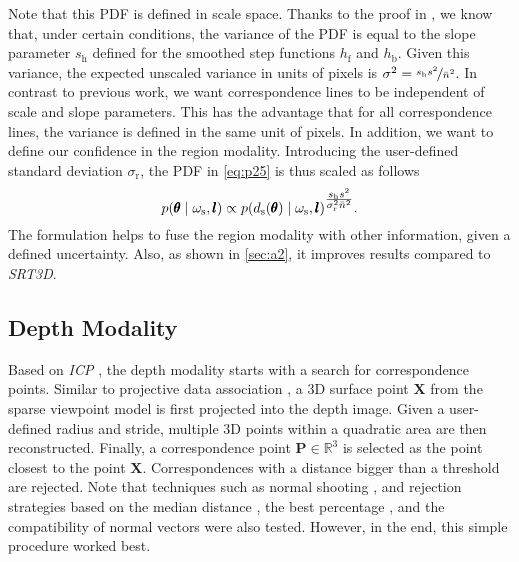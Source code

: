 \documentclass[10pt,twocolumn,letterpaper]{article}
\begin{document}
Note that this \ac{PDF} is defined in scale space.
Thanks to the proof in \cite{Stoiber2020b}, we know that, under certain conditions, the variance of the \ac{PDF} is equal to the slope parameter $s_\textrm{h}$ defined for the smoothed step functions $h_\textrm{f}$ and $h_\textrm{b}$.
Given this variance, the expected unscaled variance in units of pixels is $\sigma^2 = \nicefrac{s_\textrm{h} s^2}{\bar{n}^2}$.
In contrast to previous work, we want correspondence lines to be independent of scale and slope parameters.
This has the advantage that for all correspondence lines, the variance is defined in the same unit of pixels.
In addition, we want to define our confidence in the region modality.
Introducing the user-defined standard deviation $\sigma_\textrm{r}$, the \ac{PDF} in \cref{eq:p25} is thus scaled as follows
\begin{equation}\label{eq:t22}
p(\pmb{\theta}\mid\omega_{\textrm{s}},\pmb{l}) \propto p(d_{\textrm{s}}(\pmb{\theta})\mid\omega_{\textrm{s}},\pmb{l})^\mathlarger{\frac{s_\textrm{h}s^2}{\sigma_\textrm{r}^2\bar{n}^2}}.
\end{equation}
The formulation helps to fuse the region modality with other information, given a defined uncertainty.
Also, as shown in \cref{sec:a2}, it improves results compared to \textit{SRT3D}.



\subsection{Depth Modality}\label{ssec:p3}
Based on \textit{\ac{ICP}} \cite{Chen1992, Besl1992}, the depth modality starts with a search for correspondence points.
Similar to projective data association \cite{Blais1995}, a 3D surface point $\pmb{X}$ from the sparse viewpoint model is first projected into the depth image.
Given a user-defined radius and stride, multiple 3D points within a quadratic area are then reconstructed.
Finally, a correspondence point $\pmb{P}\in \mathbb{R}^3$ is selected as the point closest to the point $\pmb{X}$.
Correspondences with a distance bigger than a threshold are rejected.
Note that techniques such as normal shooting \cite{Chen1992, Gagnon1994}, and rejection strategies based on the median distance \cite{Diebel2004}, the best percentage \cite{Pulli1999}, and the compatibility of normal vectors \cite{Zhang1994} were also tested.
However, in the end, this simple procedure worked best.
\end{document}
